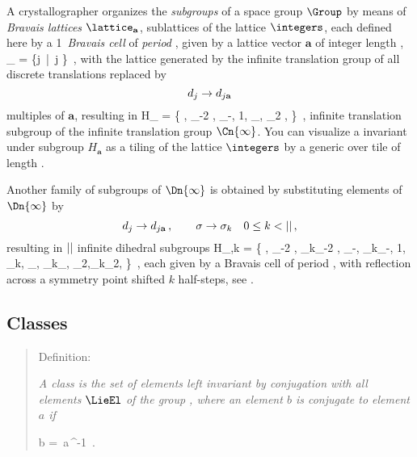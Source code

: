 A crystallographer organizes the \emph{subgroups} of a space group
$\Group$ by means of \emph{Bravais lattices} $\lattice_\mathbf{a}$,
sublattices of the lattice $\integers$, each defined here by a 1\dmn\
\emph{Bravais cell} of \emph{period} \cl{}, given by a lattice vector
$\mathbf{a}$ of integer length \cl{},
\beq
\lattice_ = \{j  \,|\, j \in \integers\}
\,,
with the lattice generated by the infinite translation group of all
discrete translations replaced by
\[
  d_{j}\to d_{j\mathbf{a}}
\]
multiples of $\mathbf{a}$, resulting in
\beq
H_{} = \{ \cdots, \shift_{-2 }, \shift_{-},
1, \shift_{\mathbf{a}}, \shift_{2 \mathbf{a}}, \cdots\}
\,,
infinite translation subgroup of the infinite translation group
$\Cn{\infty}$. You can visualize a {\lattstate} invariant under subgroup
$H_{\mathbf{a}}$ as a tiling of the lattice $\integers$ by a generic
{\lattstate} over tile of length \cl{}.

Another family of subgroups of
$\Dn{\infty}$ is obtained
by substituting elements of $\Dn{\infty}$  by
\[
  d_{j}\to d_{j\mathbf{a}}
\,,\qquad
    \sigma\to \sigma_{k}
  \quad
     0\leq{k}<{||}
\,,
\]
resulting in ${||}$ infinite dihedral subgroups
\beq
H_{,k} = \{
\cdots, \shift_{-2 }, \Refl_{k}\shift_{-2 },
        \shift_{-\mathbf{a}}, \Refl_{k}\shift_{-},
        1,                    \Refl_{k},
        \shift_{},  \Refl_{k}\shift_{},
        \shift_{2\mathbf{a}},\Refl_{k}\shift_{2\mathbf{a}}, \cdots
             \}
\,,
each given by a {Bravais cell} of period \cl{}, with reflection
across a symmetry point shifted $k$ half-steps, see
.


\subsection{Classes}
\label{s:1dLattClass}

    \begin{quote}
Definition:
{\em A class is the set of elements left
invariant by conjugation with all elements $\LieEl$ of the group \Group,
where an element $b$ is \emph{conjugate} to element $a$ {if}

}
\beq
b = \LieEl\,a\,\LieEl^{-1}
\,.
    \end{quote}



